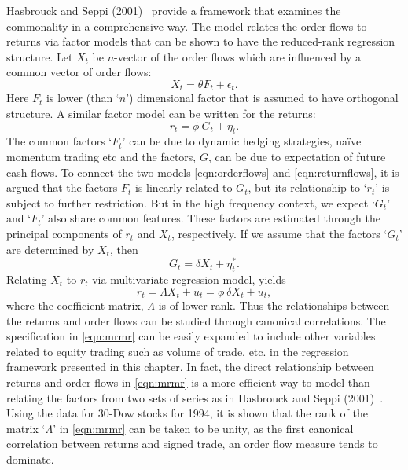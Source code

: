 Hasbrouck and Seppi (2001)~\cite{seppi2001} provide a framework that examines the commonality in a comprehensive way. The model relates the order flows to returns via factor models that can be shown to have the reduced-rank regression structure. Let $X_t$ be $n$-vector of the order flows which are influenced by a common vector of order flows:
	\begin{equation} \label{eqn:orderflows}
	X_t= \theta F_t + \epsilon_t.
	\end{equation}
Here $F_t$ is lower (than `$n$') dimensional factor that is assumed to have orthogonal structure. A similar factor model can be written for the returns:
	\begin{equation} \label{eqn:returnflows}
	r_t= \phi\ G_t + \eta_t.
	\end{equation}
The common factors `$F_t$' can be due to dynamic hedging strategies, na\"{i}ve momentum trading etc and the factors, $G$, can be due to expectation of future cash flows. To connect the two models \eqref{eqn:orderflows} and \eqref{eqn:returnflows}, it is argued that the factors $F_t$ is linearly related to $G_t$, but its relationship to `$r_t$' is subject to further restriction. But in the high frequency context, we expect `$G_t$' and `$F_t$' also share common features. These factors are estimated through the principal components of $r_t$ and $X_t$, respectively. If we assume that the factors `$G_t$' are determined by $X_t$, then
	\begin{equation} \label{eqn:determinedfactors}
	G_t= \delta X_t + \eta_t^*.
	\end{equation}
Relating $X_t$ to $r_t$ via multivariate regression model, yields 
	\begin{equation} \label{eqn:mrmr}
	r_t= \Lambda X_t + u_t = \phi\ \delta X_t + u_t,
	\end{equation}
where the coefficient matrix, $\Lambda$ is of lower rank. Thus the relationships between the returns and order flows can be studied through canonical correlations. The specification in \eqref{eqn:mrmr} can be easily expanded to include other variables related to equity trading such as volume of trade, etc. in the regression framework presented in this chapter. In fact, the direct relationship between returns and order flows in \eqref{eqn:mrmr} is a more efficient way to model than relating the factors from two sets of series as in Hasbrouck and Seppi (2001)~\cite{seppi2001}. Using the data for 30-Dow stocks for 1994, it is shown that the rank of the matrix `$\Lambda$' in \eqref{eqn:mrmr} can be taken to be unity, as the first canonical correlation between returns and signed trade, an order flow measure tends to dominate.



